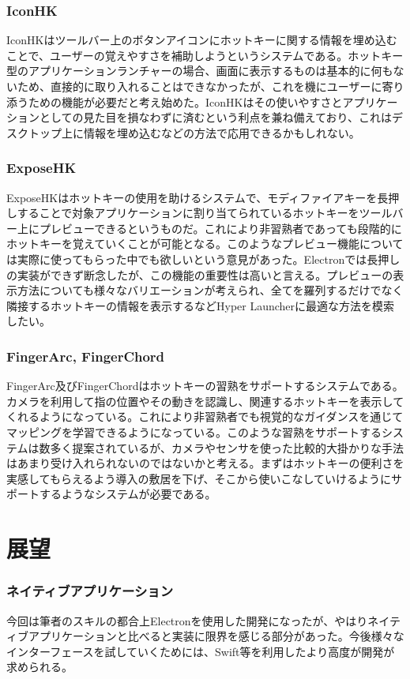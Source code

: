 \subsubsection{IconHK}
IconHK\cite{iconhk}はツールバー上のボタンアイコンにホットキーに関する情報を埋め込むことで、ユーザーの覚えやすさを補助しようというシステムである。ホットキー型のアプリケーションランチャーの場合、画面に表示するものは基本的に何もないため、直接的に取り入れることはできなかったが、これを機にユーザーに寄り添うための機能が必要だと考え始めた。IconHKはその使いやすさとアプリケーションとしての見た目を損なわずに済むという利点を兼ね備えており、これはデスクトップ上に情報を埋め込むなどの方法で応用できるかもしれない。

\subsubsection{ExposeHK}
ExposeHK\cite{exposehk}はホットキーの使用を助けるシステムで、モディファイアキーを長押しすることで対象アプリケーションに割り当てられているホットキーをツールバー上にプレビューできるというものだ。これにより非習熟者であっても段階的にホットキーを覚えていくことが可能となる。このようなプレビュー機能については実際に使ってもらった中でも欲しいという意見があった。Electronでは長押しの実装ができず断念したが、この機能の重要性は高いと言える。プレビューの表示方法についても様々なバリエーションが考えられ、全てを羅列するだけでなく隣接するホットキーの情報を表示するなどHyper Launcherに最適な方法を模索したい。

\subsubsection{FingerArc, FingerChord}
FingerArc及びFingerChord\cite{fingerarcandfinderchord}はホットキーの習熟をサポートするシステムである。カメラを利用して指の位置やその動きを認識し、関連するホットキーを表示してくれるようになっている。これにより非習熟者でも視覚的なガイダンスを通じてマッピングを学習できるようになっている。このような習熟をサポートするシステムは数多く提案されているが、カメラやセンサを使った比較的大掛かりな手法はあまり受け入れられないのではないかと考える。まずはホットキーの便利さを実感してもらえるよう導入の敷居を下げ、そこから使いこなしていけるようにサポートするようなシステムが必要である。


\section{展望}

\subsubsection{ネイティブアプリケーション}
今回は筆者のスキルの都合上Electronを使用した開発になったが、やはりネイティブアプリケーションと比べると実装に限界を感じる部分があった。今後様々なインターフェースを試していくためには、Swift等を利用したより高度が開発が求められる。

